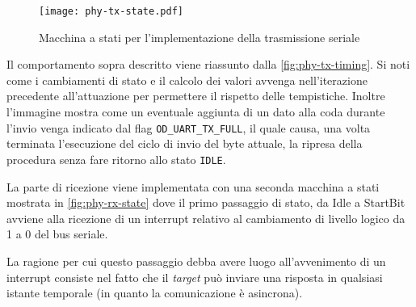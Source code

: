 \begin{figure}[t]
    \centering
    \texttt{[image: phy-tx-state.pdf]}
    \caption[]{Macchina a stati per l'implementazione della trasmissione seriale}\label{fig:phy-state-tx}
\end{figure}

Il comportamento sopra descritto viene riassunto dalla \cref{fig:phy-tx-timing}. Si noti come i cambiamenti di stato e il calcolo dei valori avvenga nell'iterazione precedente all'attuazione per permettere il rispetto delle tempistiche.
Inoltre l'immagine mostra come un eventuale aggiunta di un dato alla coda durante l'invio venga indicato dal flag \texttt{OD\_UART\_TX\_FULL}, il quale causa, una volta terminata l'esecuzione del ciclo di invio del byte attuale, la ripresa della procedura senza fare ritorno allo stato \texttt{IDLE}.

\begin{figure}[p]
\end{figure}


La parte di ricezione viene implementata con una seconda macchina a stati mostrata in \cref{fig:phy-rx-state} dove il primo passaggio di stato, da Idle a StartBit avviene alla ricezione di un interrupt relativo al cambiamento di livello logico da 1 a 0 del bus seriale.

La ragione per cui questo passaggio debba avere luogo all'avvenimento di un interrupt consiste nel fatto che il \textit{target} può inviare una risposta in qualsiasi istante temporale (in quanto la comunicazione è asincrona).

